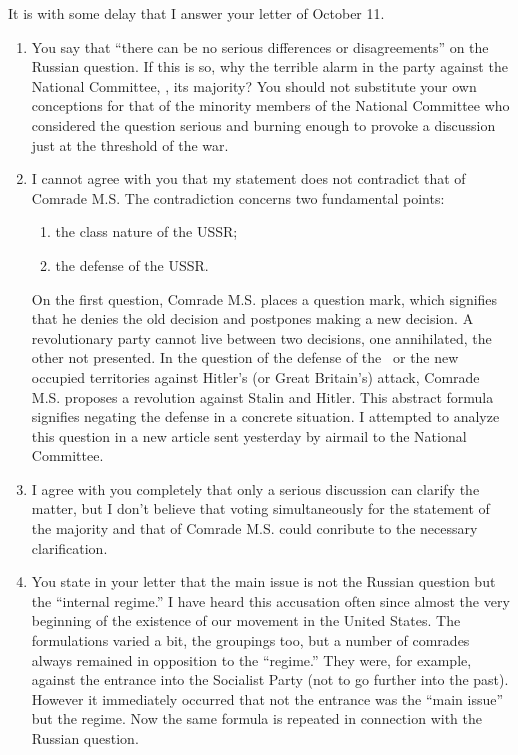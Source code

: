 

It is with some delay that I answer your letter of October 11.

\begin{enumerate}
  \item You say that “there can be no serious differences or disagreements” on the Russian question. If this is so, why the terrible alarm in the party against the National Committee, \ie, its majority? You should not substitute your own conceptions for that of the minority members of the National Committee who considered the question serious and burning enough to provoke a discussion just at the threshold of the war.
	
  \item I cannot agree with you that my statement does not contradict that of Comrade M.S\@. The contradiction concerns two fundamental points:
	
  \begin{enumerate}
	\item the class nature of the USSR;
	\item the defense of the USSR.
  \end{enumerate}

  On the first question, Comrade M.S. places a question mark, which signifies that he denies the old decision and postpones making a new decision. A revolutionary party cannot live between two decisions, one annihilated, the other not presented. In the question of the defense of the \USSR\ or the new occupied territories against Hitler’s (or Great Britain’s) attack, Comrade M.S. proposes a revolution against Stalin and Hitler. This abstract formula signifies negating the defense in a concrete situation. I attempted to analyze this question in a new article sent yesterday by airmail to the National Committee.
	
  \item I agree with you completely that only a serious discussion can clarify the matter, but I don’t believe that voting simultaneously for the statement of the majority and that of Comrade M.S. could conribute to the necessary clarification.
	
  \item You state in your letter that the main issue is not the Russian question but the “internal regime.” I have heard this accusation often since almost the very beginning of the existence of our movement in the United States. The formulations varied a bit, the groupings too, but a number of comrades always remained in opposition to the “regime.” They were, for example, against the entrance into the Socialist Party (not to go further into the past). However it immediately occurred that not the entrance was the “main issue” but the regime. Now the same formula is repeated in connection with the Russian question.
	

\end{enumerate}
